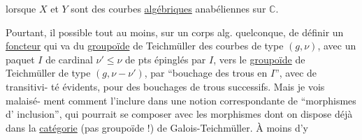 lorsque $X$ et $Y$ sont des courbes \uline{algébriques}
anabéliennes sur $\mathbb C$.

Pourtant, il   possible tout au
moins, sur un corps alg.  quelconque,
de définir un \uline{foncteur} qui va du
\uline{groupoïde} de Teichmüller des
courbes de type $(g,\nu)$,  avec un
paquet  $I$ de cardinal $\nu'\leq\nu$ de
pts épinglés par $I$, vers le \uline{groupoïde}
de Teichmüller de type $(g,\nu-\nu')$,
par ``bouchage des trous en $I$'', 
avec   de transitivi-
té évidents, pour des bouchages de
trous successifs. Mais je vois malaisé-
ment comment l'inclure dans une
notion correspondante de ``morphismes d'
inclusion'', qui pourrait se composer
avec les morphismes dont on dispose
déjà dans la \uline{catégorie} (pas groupoïde !)
de Galois-Teichmüller. À moins d'y
